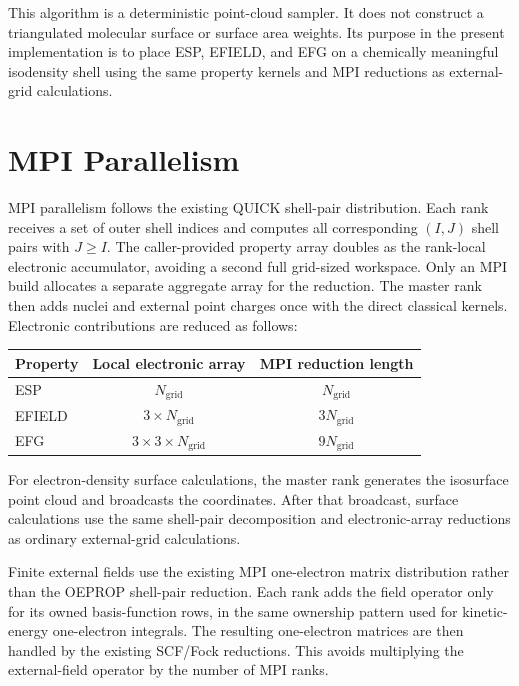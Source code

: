 \documentclass[journal=jcisd8,manuscript=suppinfo]{achemso}
\begin{document}
This algorithm is a deterministic point-cloud sampler.  It does not construct a triangulated molecular surface or surface area weights.  Its purpose in the present implementation is to place ESP, EFIELD, and EFG on a chemically meaningful isodensity shell using the same property kernels and MPI reductions as external-grid calculations.

\section{MPI Parallelism}

MPI parallelism follows the existing QUICK shell-pair distribution.  Each rank receives a set of outer shell indices and computes all corresponding \((I,J)\) shell pairs with \(J\ge I\).  The caller-provided property array doubles as the rank-local electronic accumulator, avoiding a second full grid-sized workspace.  Only an MPI build allocates a separate aggregate array for the reduction.  The master rank then adds nuclei and external point charges once with the direct classical kernels.  Electronic contributions are reduced as follows:
\begin{center}
\begin{tabular}{lcc}
\toprule
Property & Local electronic array & MPI reduction length \\
\midrule
ESP & \(N_{\mathrm{grid}}\) & \(N_{\mathrm{grid}}\) \\
EFIELD & \(3\times N_{\mathrm{grid}}\) & \(3N_{\mathrm{grid}}\) \\
EFG & \(3\times3\times N_{\mathrm{grid}}\) & \(9N_{\mathrm{grid}}\) \\
\bottomrule
\end{tabular}
\end{center}

For electron-density surface calculations, the master rank generates the isosurface point cloud and broadcasts the coordinates.  After that broadcast, surface calculations use the same shell-pair decomposition and electronic-array reductions as ordinary external-grid calculations.

Finite external fields use the existing MPI one-electron matrix distribution rather than the OEPROP shell-pair reduction.  Each rank adds the field operator only for its owned basis-function rows, in the same ownership pattern used for kinetic-energy one-electron integrals.  The resulting one-electron matrices are then handled by the existing SCF/Fock reductions.  This avoids multiplying the external-field operator by the number of MPI ranks.
\end{document}
